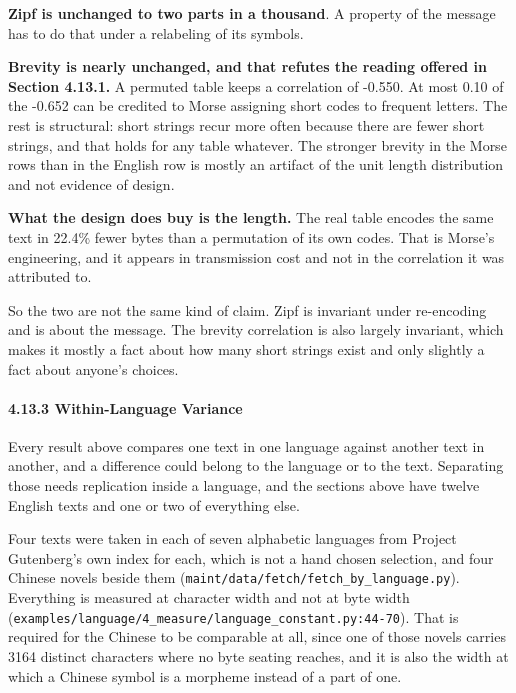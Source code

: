 \noindent\textbf{Zipf is unchanged to two parts in a thousand}. A property of the message has to do that under a relabeling of its symbols.

\noindent\textbf{Brevity is nearly unchanged, and that refutes the reading offered in Section 4.13.1.} A permuted table keeps a correlation of -0.550. At most 0.10 of the -0.652 can be credited to Morse assigning short codes to frequent letters. The rest is structural: short strings recur more often because there are fewer short strings, and that holds for any table whatever. The stronger brevity in the Morse rows than in the English row is mostly an artifact of the unit length distribution and not evidence of design.

\noindent\textbf{What the design does buy is the length.} The real table encodes the same text in 22.4\% fewer bytes than a permutation of its own codes. That is Morse's engineering, and it appears in transmission cost and not in the correlation it was attributed to.

So the two are not the same kind of claim. Zipf is invariant under re-encoding and is about the message. The brevity correlation is also largely invariant, which makes it mostly a fact about how many short strings exist and only slightly a fact about anyone's choices.

\paragraph{4.13.3 Within-Language Variance}

Every result above compares one text in one language against another text in another, and a difference could belong to the language or to the text. Separating those needs replication inside a language, and the sections above have twelve English texts and one or two of everything else.

Four texts were taken in each of seven alphabetic languages from Project Gutenberg's own index for each, which is not a hand chosen selection, and four Chinese novels beside them (\texttt{maint/\allowbreak{}data/\allowbreak{}fetch/\allowbreak{}fetch\_\allowbreak{}by\_\allowbreak{}language.\allowbreak{}py}). Everything is measured at character width and not at byte width (\texttt{examples/\allowbreak{}language/\allowbreak{}4\_\allowbreak{}measure/\allowbreak{}language\_\allowbreak{}constant.\allowbreak{}py:44-\allowbreak{}70}). That is required for the Chinese to be comparable at all, since one of those novels carries 3164 distinct characters where no byte seating reaches, and it is also the width at which a Chinese symbol is a morpheme instead of a part of one.

